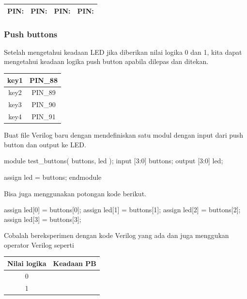 \begin{table}[H]
{\centering
\begin{tabular}{|c|c|c|c|}
\hline
PIN: \hspace{2cm} & PIN: \hspace{2cm} & PIN: \hspace{2cm} & PIN: \hspace{2cm} \\
\hline
\end{tabular}
\par}
\end{table}

\subsubsection{Push buttons}

Setelah mengetahui keadaan LED jika diberikan nilai logika 0 dan 1, kita
dapat mengetahui keadaan logika push button apabila dilepas dan ditekan.

\begin{table}[H]
\centering
\begin{tabular}{|c|c|}
\hline 
key1 & PIN\_88 \\
\hline 
key2 & PIN\_89 \\
\hline 
key3 & PIN\_90 \\
\hline 
key4 & PIN\_91 \\
\hline 
\end{tabular}
\par
\end{table}


Buat file Verilog baru dengan mendefiniskan satu modul
dengan input dari push button dan output ke LED.

\begin{verilogcode}
module test_buttons( buttons, led );
  input  [3:0] buttons;
  output [3:0] led;

  assign led = buttons;
endmodule
\end{verilogcode}

Bisa juga menggunakan potongan kode berikut.
\begin{verilogcode}
  assign led[0] = buttons[0];
  assign led[1] = buttons[1];
  assign led[2] = buttons[2];
  assign led[3] = buttons[3];
\end{verilogcode}

Cobalah bereksperimen dengan kode Verilog yang ada dan juga menggukan operator Verilog
seperti 

\begin{table}[H]
\centering
\begin{tabular}{|c|c|}
\hline
Nilai logika & Keadaan PB \\
\hline
0 & \\
1 & \\
\hline
\end{tabular}
\par
\end{table}

